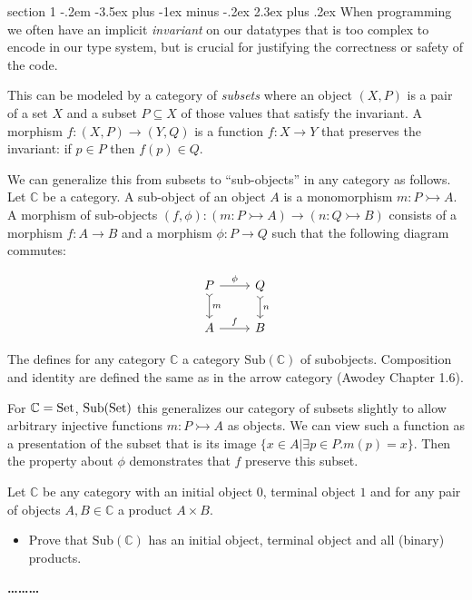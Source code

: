 \documentclass[12pt]{article}
\makeatletter
\newenvironment{problem}{\@startsection
       {section}
       {1}
       {-.2em}
       {-3.5ex plus -1ex minus -.2ex}
       {2.3ex plus .2ex}
       {\pagebreak[3]%
       \large\bf\noindent{Problem }
       }
       }
       {%
       \begin{center}\large\bf \ldots\ldots\ldots\end{center}}
\makeatother
\begin{document}
\begin{problem}{}
  When programming we often have an implicit \emph{invariant} on our
  datatypes that is too complex to encode in our type system, but is
  crucial for justifying the correctness or safety of the code.

  This can be modeled by a category of \emph{subsets} where an object
  $(X,P)$ is a pair of a set $X$ and a subset $P \subseteq X$ of those
  values that satisfy the invariant. A morphism $f : (X,P) \to (Y,Q)$
  is a function $f : X\to Y$ that preserves the invariant: if $p \in
  P$ then $f(p) \in Q$.

  We can generalize this from subsets to ``sub-objects'' in any
  category as follows. Let $\mathbb C$ be a category. A sub-object of
  an object $A$ is a monomorphism $m : P \rightarrowtail A$. A
  morphism of sub-objects $(f, \phi) : (m : P \rightarrowtail A) \to
  (n : Q \rightarrowtail B)$ consists of a morphism $f : A \to B$ and
  a morphism $\phi : P \to Q$ such that the following diagram
  commutes:

  \[%
  \begin{tikzcd}
    P \arrow[d, "m", tail] \arrow[r, "\phi"] & Q \arrow[d, "n", tail] \\
    A \arrow[r, "f"]                         & B                     
  \end{tikzcd}\]

  The defines for any category $\mathbb C$ a category
  $\textrm{Sub}(\mathbb C)$ of subobjects. Composition and identity are
  defined the same as in the arrow category (Awodey Chapter 1.6).

  For $\mathbb C = \textrm{Set}$, $\textrm{Sub}(\textrm{Set})$ this generalizes our
  category of subsets slightly to allow arbitrary injective functions
  $m : P \rightarrowtail A$ as objects. We can view such a function as
  a presentation of the subset that is its image $\{ x \in A | \exists
  p \in P. m(p) = x \}$. Then the property about $\phi$ demonstrates
  that $f$ preserve this subset.

  Let $\mathbb C$ be any category with an initial object $0$, terminal
  object $1$ and for any pair of objects $A,B \in \mathbb C$ a product
  $A \times B$.

  \begin{itemize}
  \item
    Prove that $\textrm{Sub}(\mathbb C)$ has an initial object, terminal
    object and all (binary) products.
  \end{itemize}
\end{problem}


\end{document}
